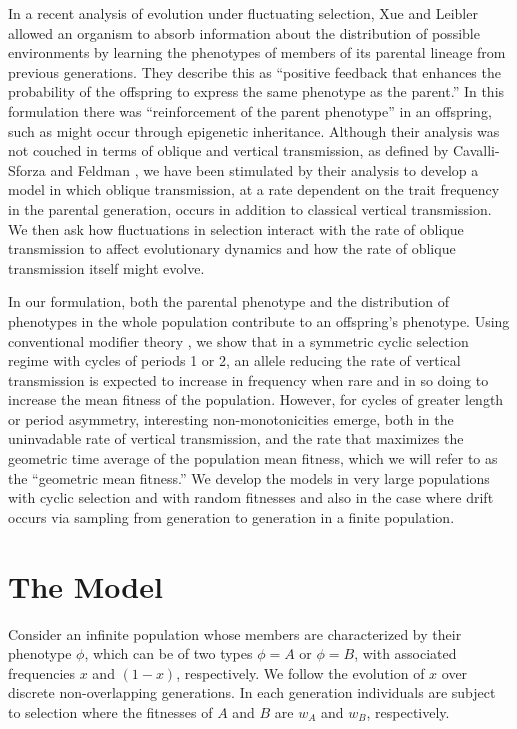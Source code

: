 \documentclass[9pt,twocolumn,twoside,lineno]{pnas-new}
\begin{document}
In a recent analysis of evolution under fluctuating selection, Xue and Leibler \cite{xue2016evolutionary} allowed an organism to absorb information about the distribution of possible environments by learning the phenotypes of members of its parental lineage from previous generations. They describe this as ``positive feedback that enhances the probability of the offspring to express the same phenotype as the parent.'' In this formulation there was ``reinforcement of the parent phenotype'' in an offspring, such as might occur through epigenetic inheritance. Although their analysis was not couched in terms of oblique and vertical transmission, as defined by Cavalli-Sforza and Feldman \cite{cavalli1981cultural}, we have been stimulated by their analysis to develop a model in which oblique transmission, at a rate dependent on the trait frequency in the parental generation, occurs in addition to classical vertical transmission. We then ask how fluctuations in selection interact with the rate of oblique transmission to affect evolutionary dynamics and how the rate of oblique transmission itself might evolve. 

In our formulation, both the parental phenotype and the distribution of phenotypes in the whole population contribute to an offspring's phenotype. Using conventional modifier theory \cite{feldman1986evolutionary}, we show that in a symmetric cyclic selection regime with cycles of periods 1 or 2, an allele reducing the rate of vertical transmission is expected to increase in frequency when rare and in so doing to increase the mean fitness of the population. However, for cycles of greater length or period asymmetry, interesting non-monotonicities emerge, both in the uninvadable rate of vertical transmission, and the rate that maximizes the geometric time average of the population mean fitness, which we will refer to as the ``geometric mean fitness.'' We develop the models in very large populations with cyclic selection and with random fitnesses and also in the case where drift occurs via sampling from generation to generation in a finite population.

\section{The Model}

Consider an infinite population whose members are characterized by their phenotype $\phi$, which can be of two types $\phi=A$ or $\phi=B$, with associated frequencies $x$ and $(1-x)$, respectively. We follow the evolution of $x$ over discrete non-overlapping generations. In each generation individuals are subject to  selection where the fitnesses of $A$ and $B$ are $w_A$ and $w_B$, respectively.
\end{document}
